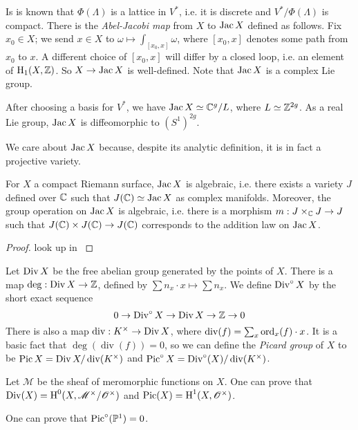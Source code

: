 \documentclass{article}
\begin{document}
Is is known that $\Phi(\Lambda)$ is a lattice in $V^*$, i.e. it is discrete 
and $V^*/\Phi(\Lambda)$ is compact. There is the \emph{Abel-Jacobi map} from 
$X$ to $\operatorname{Jac} X$ defined as follows. Fix $x_0\in X$; we send $x\in X$ to 
$\omega\mapsto \int_{[x_0,x]} \omega$, where $[x_0,x]$ denotes some path from 
$x_0$ to $x$. A different choice of $[x_0,x]$ will differ by a closed loop, 
i.e. an element of $\operatorname{H}_1(X,\mathbb{Z})$. So $X\to\operatorname{Jac} X$ is well-defined. Note 
that $\operatorname{Jac} X$ is a complex Lie group. 

\begin{remark}
After choosing a basis for $V^*$, we have $\operatorname{Jac} X\simeq \mathbb{C}^g/L$, where 
$L\simeq \mathbb{Z}^{2 g}$. As a real Lie group, $\operatorname{Jac} X$ is diffeomorphic to 
$(S^1)^{2 g}$. 
\end{remark}

We care about $\operatorname{Jac} X$ because, despite its analytic definition, it is in fact 
a projective variety.

\begin{theorem}
For $X$ a compact Riemann surface, $\operatorname{Jac} X$ is algebraic, i.e. there exists a 
variety $J$ defined over $\mathbb{C}$ such that $J(\mathbb{C})\simeq\operatorname{Jac} X$ as 
complex manifolds. Moreover, the group operation on $\operatorname{Jac} X$ is algebraic, 
i.e. there is a morphism $m:J\times_{\mathbb{C}} J\to J$ such that 
$J(\mathbb{C})\times J(\mathbb{C})\to J(\mathbb{C})$ corresponds to the 
addition law on $\operatorname{Jac} X$. 
\end{theorem}
\begin{proof}
look up in \cite{mu08}
\end{proof}

Let $\operatorname{Div} X$ be the free abelian group generated by the points of $X$. There 
is a map $\deg:\operatorname{Div} X\to \mathbb{Z}$, defined by 
$\sum n_x\cdot x\mapsto \sum n_x$. We define $\operatorname{Div}^\circ X$ by the short exact 
sequence 
\[
  0 \to \operatorname{Div}^\circ X \to \operatorname{Div} X \to \mathbb{Z} \to 0
\]
There is also a map $\operatorname{div}:K^\times\to \operatorname{Div} X$, where 
$\operatorname{div}(f) = \sum_x \operatorname{ord}_x(f)\cdot x$. It is a basic fact that 
$\deg(\operatorname{div}(f)) = 0$, so we can define the \emph{Picard group} 
of $X$ to be $\operatorname{Pic} X = \operatorname{Div} X/\operatorname{div}(K^\times)$ and 
$\operatorname{Pic}^\circ X = \operatorname{Div}^\circ (X)/\operatorname{div}(K^\times)$. 

\begin{remark}
Let $\mathscr{M}$ be the sheaf of meromorphic functions on $X$. One can 
prove that $\operatorname{Div}(X)=\operatorname{H}^0(X,\mathscr{M}^\times/\mathscr{O}^\times)$ and 
$\operatorname{Pic}(X)=\operatorname{H}^1(X,\mathscr{O}^\times)$. 
\end{remark}

\begin{example}
One can prove that $\operatorname{Pic}^\circ(\mathbb{P}^1) = 0$.
\end{example}
\end{document}
